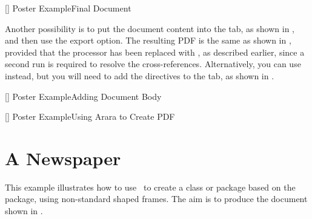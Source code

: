 []
{}
{Poster Example\dash Final Document}

Another possibility is to put the document content into the 
 tab, as shown in
, and then use the 
export option. The resulting PDF is the same as shown in
, provided that the 
processor has been replaced with , as described
earlier, since a second run is required to resolve the
cross-references. Alternatively, you can use  instead,
but you will need to add the directives to the
 tab, as shown in 
.

[]
{}
{Poster Example\dash Adding Document Body}

[]
{}
{Poster Example\dash Using Arara to Create PDF}

\section{A Newspaper}\label{sec:newstutorial}

This example illustrates how to use \FlowframTk\ to create a
class or package based on the  package, using non-standard
shaped frames. The aim is to produce the document shown in
.


